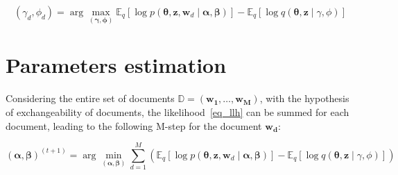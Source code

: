 \documentclass[12pt,a4paper,onecolumn]{article}
\begin{document}
\begin{equation*}
	(\gamma_d, \phi_d) = \operatorname{arg}\max_{(\bm{\gamma}, \bm{\phi})} \mathbb{E}_{q}\left[\log p(\bm{\theta},\bm{z}, \bm{w}_d \mid \bm{\alpha}, \bm{\beta})\right] - \mathbb{E}_{q}\left[\log q(\bm{\theta}, \bm{z} \mid \gamma, \phi)\right]              \tag{E-step}
\end{equation*}


\section{Parameters estimation}


Considering the entire set of documents \(\mathbb{D} = (\bm{w_1}, \dots, \bm{w_M})\), with the hypothesis of exchangeability of documents, the likelihood~\eqref{eq_llh} can be summed for each document, leading to the following M-step for the document \(\bm{w_d}\):

\begin{equation}
	(\bm{\alpha}, \bm{\beta})^{(t+1)} = \operatorname{arg}\min_{(\bm{\alpha}, \bm{\beta})} \sum_{d=1}^M\left(\mathbb{E}_{q}\left[\log p(\bm{\theta},\bm{z}, \bm{w}_d \mid \bm{\alpha}, \bm{\beta})\right] - \mathbb{E}_{q}\left[\log q(\bm{\theta}, \bm{z} \mid \gamma, \phi)\right]\right)          \tag{M-step}
\end{equation}

\end{document}
